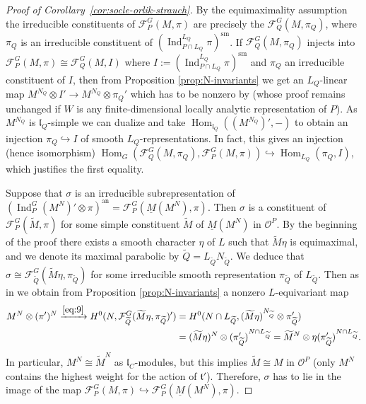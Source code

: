 \documentclass[a4paper]{amsart}
\numberwithin{equation}{section}
\theoremstyle{remark}
\theoremstyle{definition}
\DeclareMathOperator{\Ind}{Ind}
\DeclareMathOperator{\Hom}{Hom}
\newcommand{\sm}{\mathrm{sm}}
\newcommand{\an}{\mathrm{an}}
\newcommand{\into}{\hookrightarrow}
\begin{document}
\begin{proof}[Proof of Corollary~\ref{cor:socle-orlik-strauch}]
  By the equimaximality assumption the irreducible constituents of $\mathcal{F}_P^G(M,\pi)$ are precisely
  the $\mathcal{F}_Q^G (M,\pi_Q)$, where $\pi_Q$ is an irreducible constituent of $(\Ind_{P\cap L_{Q}}^{L_{Q}}\pi)^{\sm}$.
  If $\mathcal{F}_Q^G(M,\pi_Q)$ injects into $\mathcal{F}_P^G(M,\pi) \cong \mathcal{F}_Q^G(M,I)$ where $I := (\Ind_{P\cap L_Q}^{L_Q} \pi)^{\sm}$ and
  $\pi_Q$ an irreducible constituent of $I$, then from Proposition \ref{prop:N-invariants} we get an $L_Q$-linear map
  $M^{N_Q} \otimes I' \to M^{N_Q} \otimes \pi_Q'$ which has to be nonzero by \cite[Lemme 2.2]{socle1} (whose proof remains unchanged
  if $W$ is any finite-dimensional locally analytic representation of $P$).  As $M^{N_Q}$ is
  $\mathfrak{l}_Q$-simple we can dualize and take $\Hom_{\mathfrak{l}_Q}((M^{N_Q})',-)$ to obtain an injection $\pi_Q \into I$ of smooth $L_Q$-representations.
  In fact, this gives an injection (hence isomorphism) $\Hom_G(\mathcal{F}_Q^G(M,\pi_Q),\mathcal{F}_P^G(M,\pi)) \into \Hom_{L_Q}(\pi_Q,I)$, which justifies the first equality.

  Suppose that $\sigma$ is an irreducible subrepresentation of $(\Ind_P^G (M^N)' \otimes \pi)^{\an} = \mathcal{F}_P^G(\underline M(M^N),\pi)$. 
  Then $\sigma$ is a constituent of $\mathcal{F}_P^G(\widetilde{M},\pi)$ for some simple constituent $\widetilde{M}$ of $\underline M(M^N)$ in $\mathcal{O}^{P}$.
  By the beginning of the proof there exists a smooth character $\eta$ of $L$ such that $\widetilde{M}\eta$ is equimaximal,
  and we denote its maximal parabolic by $\widetilde{Q} = L_{\widetilde{Q}} N_{\widetilde{Q}}$.
  We deduce that $\sigma \cong \mathcal{F}_{\widetilde{Q}}^G(\widetilde{M} \eta,\pi_{\widetilde{Q}})$ for some irreducible smooth representation $\pi_{\widetilde{Q}}$ of $L_{\widetilde{Q}}$.
  Then as in \cite{socle1} we obtain from Proposition \ref{prop:N-invariants} a nonzero $L$-equivariant map
  \begin{align*}
    M^N \otimes (\pi')^N \xrightarrow{\eqref{eq:9}} H^0(N, \mathcal{F}_{\widetilde{Q}}^G (\widetilde{M} \eta,\pi_{\widetilde{Q}})') & = H^0(N \cap L_{\widetilde{Q}}, (\widetilde{M} \eta)^{N_{\widetilde{Q}}} \otimes \pi_{\widetilde{Q}}')\\
    &= (\widetilde{M}\eta)^N \otimes (\pi_{\widetilde{Q}}')^{N \cap L_{\widetilde{Q}}}
    = \widetilde{M}^N \otimes \eta(\pi_{\widetilde{Q}}')^{N \cap L_{\widetilde{Q}}}.
  \end{align*}
  In particular, $M^N \cong \widetilde{M}^N$ as $\mathfrak{l}_{C}$-modules, but this implies $\widetilde{M} \cong M$ in $\mathcal{O}^{P}$ (only $M^N$ contains the highest weight for the action of $\mathfrak{t}'$).
  Therefore, $\sigma$ has to lie in the image of the map $\mathcal{F}_P^G(M,\pi) \into \mathcal{F}_P^G(\underline M(M^N),\pi)$.
\end{proof}
\end{document}
